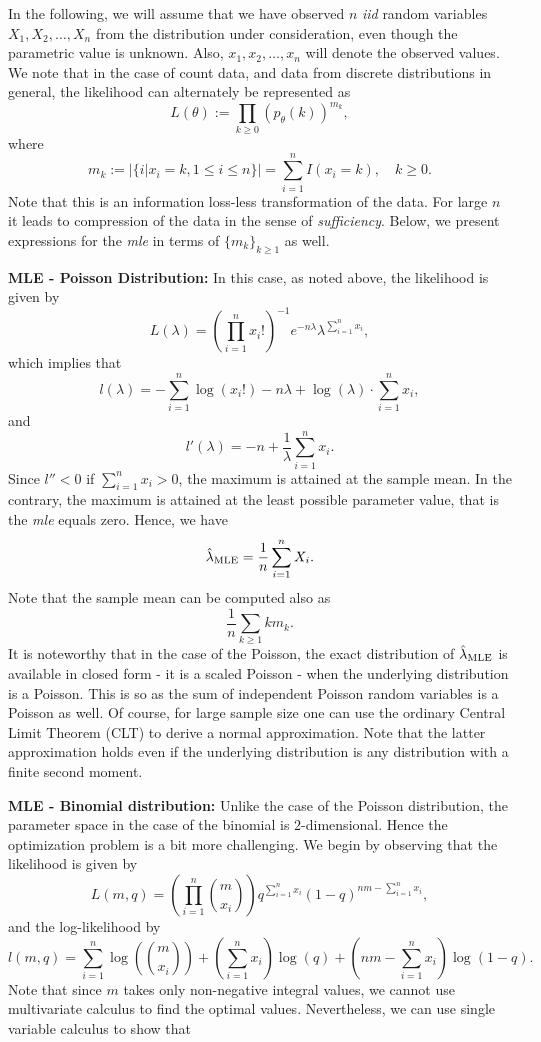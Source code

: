 \documentclass[]{book}
\theoremstyle{definition}
\theoremstyle{definition}
\theoremstyle{definition}
\theoremstyle{remark}
\begin{document}
In the following, we will assume that we have observed \(n\) \emph{iid}
random variables \(X_1,X_2,\ldots,X_n\) from the distribution under
consideration, even though the parametric value is unknown. Also,
\(x_1,x_2,\ldots,x_n\) will denote the observed values. We note that in
the case of count data, and data from discrete distributions in general,
the likelihood can alternately be represented as \[
L(\theta):=\prod_{k\geq 0} \left(p_\theta(k)\right)^{m_k},
\] where \[
m_k:= \left\vert \{i\vert x_i=k, 1\leq i \leq n\} \right\vert=\sum_{i= 1}^n I(x_i=k), \quad k\geq 0.
\] Note that this is an information loss-less transformation of the
data. For large \(n\) it leads to compression of the data in the sense
of \emph{sufficiency}. Below, we present expressions for the \emph{mle}
in terms of \(\{m_k\}_{k\geq 1}\) as well.

\textbf{MLE - Poisson Distribution:} In this case, as noted above, the
likelihood is given by \[
L(\lambda)=\left(\prod_{i=1}^n x_i!\right)^{-1}e^{-n\lambda}\lambda^{\sum_{i=1}^n x_i},
\] which implies that \[
l(\lambda)= -\sum_{i=1}^n \log(x_i!) -n\lambda +\log(\lambda) \cdot \sum_{i=1}^n x_i,
\] and \[
l'(\lambda)= -n +\frac{1}{\lambda}\sum_{i=1}^n x_i.
\] Since \(l''< 0\) if \(\sum_{i=1}^n x_i>0\), the maximum is attained
at the sample mean. In the contrary, the maximum is attained at the
least possible parameter value, that is the \emph{mle} equals zero.
Hence, we have\\
\[
\hat{\lambda}_{\rm MLE} = \frac{1}{n}\sum_{i=1}^n X_i.
\] Note that the sample mean can be computed also as \[
\frac{1}{n} \sum_{k\geq 1} km_k.
\] It is noteworthy that in the case of the Poisson, the exact
distribution of \(\hat{\lambda}_{\rm MLE}\) is available in closed form
- it is a scaled Poisson - when the underlying distribution is a
Poisson. This is so as the sum of independent Poisson random variables
is a Poisson as well. Of course, for large sample size one can use the
ordinary Central Limit Theorem (CLT) to derive a normal approximation.
Note that the latter approximation holds even if the underlying
distribution is any distribution with a finite second moment.

\textbf{MLE - Binomial distribution:} Unlike the case of the Poisson
distribution, the parameter space in the case of the binomial is
\(2\)-dimensional. Hence the optimization problem is a bit more
challenging. We begin by observing that the likelihood is given by \[
L(m,q)= \left(\prod_{i=1}^n \binom{m}{x_i}\right) q^{\sum_{i=1}^n x_i} (1-q)^{nm-\sum_{i=1}^n x_i},
\] and the log-likelihood by \[
l(m,q)= \sum_{i=1}^n \log\left(\binom{m}{x_i}\right) + \left({\sum_{i=1}^n x_i}\right)\log(q)+ \left({nm-\sum_{i=1}^n x_i}\right)\log(1-q).
\] Note that since \(m\) takes only non-negative integral values, we
cannot use multivariate calculus to find the optimal values.
Nevertheless, we can use single variable calculus to show that
\end{document}

